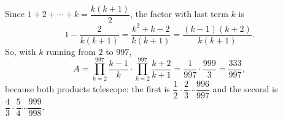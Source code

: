 Since $1+2+\cdots+k=\dfrac{k(k+1)}{2}$, the factor with last term $k$ is
\[
1-\dfrac{2}{k(k+1)}=\dfrac{k^2+k-2}{k(k+1)}=\dfrac{(k-1)(k+2)}{k(k+1)}.
\]
So, with $k$ running from $2$ to $997$,
\[
A=\prod_{k=2}^{997}\dfrac{k-1}{k}\cdot\prod_{k=2}^{997}\dfrac{k+2}{k+1}=\dfrac{1}{997}\cdot\dfrac{999}{3}=\boxed{\dfrac{333}{997}},
\]
because both products telescope: the first is $\dfrac{1}{2}\cdot\dfrac{2}{3}\cdots\dfrac{996}{997}$ and the second is $\dfrac{4}{3}\cdot\dfrac{5}{4}\cdots\dfrac{999}{998}$.
